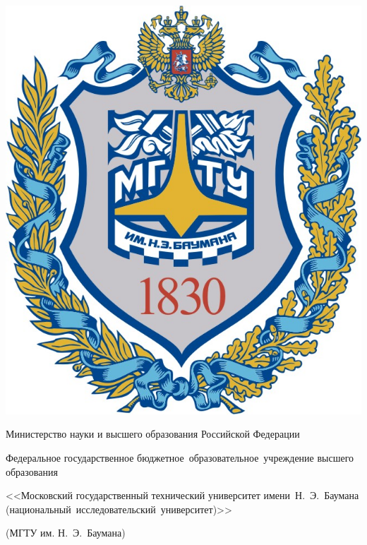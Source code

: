 \begin{titlepage}
	\begin{center}
		\fontsize{12pt}{12pt}\selectfont

		\fbox
		{
			\begin{minipage}{0.15\textwidth}
				\includegraphics[width=\linewidth]{images/bmstu.png}
			\end{minipage}
			\hfill

			\vrule
			\hspace{0.2cm}

			\begin{minipage}{0.80\textwidth}\centering\bfseries
				{
					\linespread{1}\selectfont
					{Министерство науки и высшего образования Российской Федерации}

					{Федеральное государственное бюджетное~образовательное~учреждение высшего образования}

					{<<Московский государственный технический университет имени~Н.~Э.~Баумана (национальный~исследовательский~университет)>>}

					{(МГТУ им. Н.~Э.~Баумана)}
				}
			\end{minipage}
		}


\end{center}
\end{titlepage}
